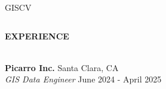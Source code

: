 \documentclass[letterpaper]{article}
\newcommand{\lineunder} {
        \vspace*{-8pt} \\
        \hspace*{-18pt} \hrulefill \\
    }
\newcommand{\header} [1] {
        \vspace{9pt}
        {\hspace*{-18pt}\vspace*{6pt} \large \textbf {#1}}
        \vspace*{-6pt} \lineunder
        \vspace{2pt}
    }
\newcommand{\employer}[4]{
        \vspace{3pt}
        \textbf{#1}  %
        \hfill #2\\  %
        \textit{#3}  %
        \hfill #4\\  %
        \vspace{3mm}
    }
\newenvironment{skillslist}
        {
            \hspace*{-0.07in}\begin{tabular}[t]{ l L{5.17in} }
        }{
            \end{tabular}
        }
\begin{document}
\begin{taggedblock}{GISCV}
\begin{skillslist}
        \end{skillslist}
    \end{taggedblock}



\header{EXPERIENCE}



\employer
    {Picarro Inc.}
    {Santa Clara, CA}
    {GIS Data Engineer}
    {June 2024 - April 2025}
\end{document}
